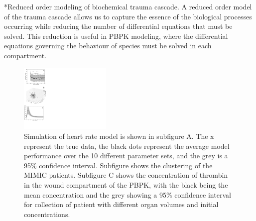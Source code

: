 \documentclass[11pt]{article}
\makeatletter
\renewcommand\paragraph{\@startsection
  {paragraph}{2}{0mm}
  {-0.05in}
  {-0.5\baselineskip}
  {\normalfont\normalsize\itshape}}
\makeatother
\begin{document}
\paragraph*{Reduced order modeling of biochemical trauma cascade.}
A reduced order model of the trauma cascade allows us to capture the essence of the biological processes occurring while reducing the number of differential equations that must be solved. This reduction is useful in PBPK modeling, where the differential equations governing the behaviour of species must be solved in each compartment. 
\begin{figure}
  \includegraphics[width=0.39\textwidth,trim={0cm 2cm 20.2cm 0},clip]{./figures/colfigure.pdf}
  \caption{Simulation of heart rate model is shown in subfigure A. The x represent the true data, the black dots represent the average model performance over the 10 different parameter sets, and the grey is a 95\% confidence interval. Subfigure shows the clustering of the MIMIC patients. Subfigure C shows the concentration of thrombin in the wound compartment of the PBPK, with the black being the mean concentration and the grey showing a 95\% confidence interval for collection of patient with different organ volumes and initial concentrations.}\label{fig:mulitobjperformance}
\end{figure}
\end{document}
